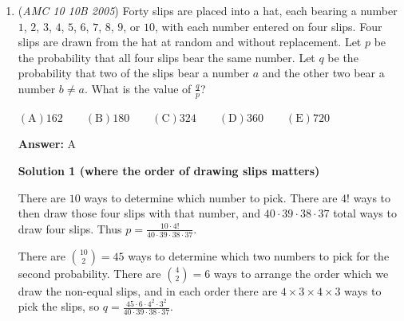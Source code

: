 \begin{enumerate}
We can first solve for the mean for the digits $1, 3, 5, 7,$and $9$ since each is $2$ away from each other. The mean of the numbers than can be solved using these digits is $55555$. The total amount of numbers that can be formed using these digits is $5! =120$. The sum of these numbers is $55555(120) = 6666600$. Now we can find out the total value that was gained by replacing the $8$ with a $9$. We can start how be calculating the gain when the $8$ was in the ones digit. Since there are $4! = 24$ numbers with the $8$ in the ones digit and $1$ was gain from each of them, $24$ is the number gained. Then, we repeat this with the tens, hundreds, thousands, and ten thousands place, leading to a total of $24+240+2400+24000+240000=266664$ as the total amount that was gained. Subtract this amount from the sum of the digits using the $9$ instead of the $8$ to get $6666600-266664=6399936$. Finally, we divide this by $120$ to get the average. $\frac{6399936}{120}= \boxed{\textbf{(C) }53332.8}$



	\item (\textit{AMC 10 10B 2005}) Forty slips are placed into a hat, each bearing a number $1$, $2$, $3$, $4$, $5$, $6$, $7$, $8$, $9$, or $10$, with each number entered on four slips. Four slips are drawn from the hat at random and without replacement. Let $p$ be the probability that all four slips bear the same number. Let $q$ be the probability that two of the slips bear a number $a$ and the other two bear a number $b \neq a$. What is the value of $\frac{q}{p}$?


 $\mathrm{(A)} 162 \qquad \mathrm{(B)} 180 \qquad \mathrm{(C)} 324 \qquad \mathrm{(D)} 360 \qquad \mathrm{(E)} 720$

 \textbf{Answer: }A



\textbf{Solution 1 (where the order of drawing slips matters)}

There are $10$ ways to determine which number to pick. There are $4!$ ways to then draw those four slips with that number, and $40 \cdot 39 \cdot 38 \cdot 37$ total ways to draw four slips. Thus $p = \frac{10\cdot 4!}{40 \cdot 39 \cdot 38 \cdot 37}$. 

 There are ${10 \choose 2} = 45$ ways to determine which two numbers to pick for the second probability. There are ${4 \choose 2} = 6$ ways to arrange the order which we draw the non-equal slips, and in each order there are $4 \times 3 \times 4 \times 3$ ways to pick the slips, so $q = \frac{45 \cdot 6 \cdot 4^2 \cdot 3^2}{40 \cdot 39 \cdot 38 \cdot 37}$. 


\end{enumerate}
